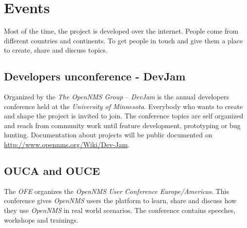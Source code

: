 \section{Events}
Most of the time, the project is developed over the internet. People come from different countries and continents. To get people in touch and give them a place to create, share and discuss topics.
\subsection{Developers unconference - DevJam}
Organized by the \emph{The OpenNMS Group} – \emph{DevJam} is the annual developers conference held at the \emph{University of Minnesota}. Everybody who wants to create and shape the project is invited to join. The conference topics are self organized and reach from community work until feature development, prototyping or bug hunting. Documentation about projects will be public documented on \url{http://www.opennms.org/Wiki/Dev-Jam}.
\subsection{OUCA and OUCE}
The \emph{OFE} organizes the \emph{OpenNMS User Conference Europe/Americas}. This conference gives \emph{OpenNMS} users the platform to learn, share and discuss how they use \emph{OpenNMS} in real world scenarios. The conference contains speeches, workshops and trainings.
